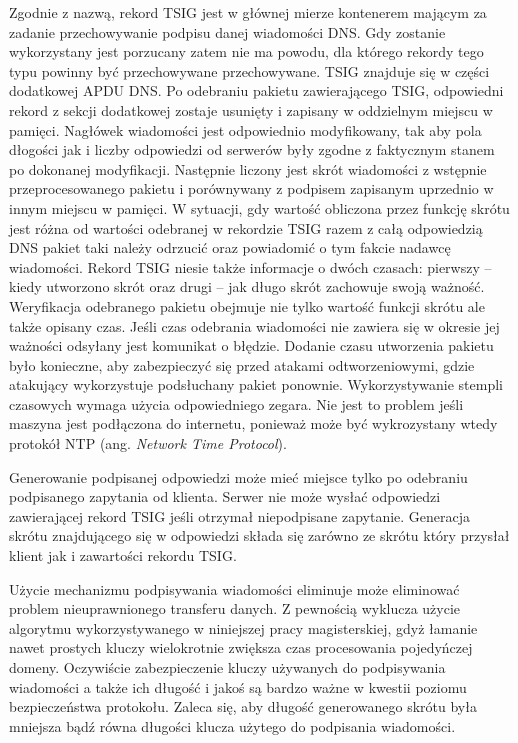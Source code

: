 Zgodnie z nazwą, rekord TSIG jest w głównej mierze kontenerem mającym za zadanie przechowywanie podpisu danej wiadomości DNS. Gdy zostanie wykorzystany jest porzucany zatem nie ma powodu, dla którego rekordy tego typu powinny być przechowywane przechowywane. TSIG znajduje się w części dodatkowej APDU DNS. Po odebraniu pakietu zawierającego TSIG, odpowiedni rekord z sekcji dodatkowej zostaje usunięty i zapisany w oddzielnym miejscu w pamięci. Nagłówek wiadomości jest odpowiednio modyfikowany, tak aby pola dłogości jak i liczby odpowiedzi od serwerów były zgodne z faktycznym stanem po dokonanej modyfikacji. Następnie liczony jest skrót wiadomości z wstępnie przeprocesowanego pakietu i porównywany z podpisem zapisanym uprzednio w innym miejscu w pamięci. W sytuacji, gdy wartość obliczona przez funkcję skrótu jest różna od wartości odebranej w rekordzie TSIG razem z całą odpowiedzią DNS pakiet taki należy odrzucić oraz powiadomić o tym fakcie nadawcę wiadomości. Rekord TSIG niesie także informacje o dwóch czasach: pierwszy -- kiedy utworzono skrót oraz drugi -- jak długo skrót zachowuje swoją ważność. Weryfikacja odebranego pakietu obejmuje nie tylko wartość funkcji skrótu ale także opisany czas. Jeśli czas odebrania wiadomości nie zawiera się w okresie jej ważności odsyłany jest komunikat o błędzie. Dodanie czasu utworzenia pakietu było konieczne, aby zabezpieczyć się przed atakami odtworzeniowymi, gdzie atakujący wykorzystuje podsłuchany pakiet ponownie. Wykorzystywanie stempli czasowych wymaga użycia odpowiedniego zegara. Nie jest to problem jeśli maszyna jest podłączona do internetu, ponieważ może być wykrozystany wtedy protokół NTP (ang. \textit{Network Time Protocol})\cite{RFC5905}.

Generowanie podpisanej odpowiedzi może mieć miejsce tylko po odebraniu podpisanego zapytania od klienta. Serwer nie może wysłać odpowiedzi zawierającej rekord TSIG jeśli otrzymał niepodpisane zapytanie. Generacja skrótu znajdującego się w odpowiedzi składa się zarówno ze skrótu który przysłał klient jak i zawartości rekordu TSIG\cite{nask-tsig}.

Użycie mechanizmu podpisywania wiadomości eliminuje może eliminować problem nieuprawnionego transferu danych. Z pewnością wyklucza użycie algorytmu wykorzystywanego w niniejszej pracy magisterskiej, gdyż łamanie nawet prostych kluczy wielokrotnie zwiększa czas procesowania pojedyńczej domeny\cite{nask-tsig}. Oczywiście zabezpieczenie kluczy używanych do podpisywania wiadomości a także ich długość i jakoś są bardzo ważne w kwestii poziomu bezpieczeństwa protokołu. Zaleca się, aby długość generowanego skrótu była mniejsza bądź równa długości klucza użytego do podpisania wiadomości.

